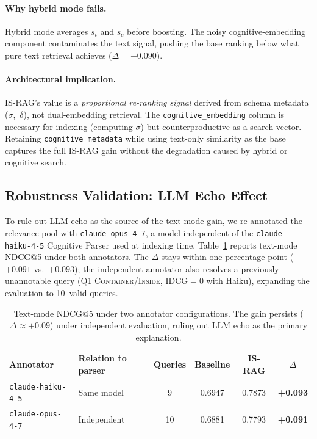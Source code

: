 \documentclass[11pt,a4paper]{article}
\begin{document}
\paragraph{Why hybrid mode fails.}
Hybrid mode averages $s_t$ and $s_c$ before boosting.
The noisy cognitive-embedding component contaminates the text signal,
pushing the base ranking below what pure text retrieval achieves
($\Delta = -0.090$).

\paragraph{Architectural implication.}
IS-RAG's value is a \emph{proportional re-ranking signal} derived from
schema metadata ($\sigma$,~$\delta$), not dual-embedding retrieval.
The \texttt{cognitive\_embedding} column is necessary for indexing
(computing $\sigma$) but counterproductive as a search vector.
Retaining \texttt{cognitive\_metadata} while using text-only similarity
as the base captures the full IS-RAG gain without the degradation
caused by hybrid or cognitive search.

\subsection{Robustness Validation: LLM Echo Effect}
\label{sec:robustness}

To rule out LLM echo as the source of the text-mode gain, we
re-annotated the relevance pool with \texttt{claude-opus-4-7}, a model
independent of the \texttt{claude-haiku-4-5} Cognitive Parser used at
indexing time.
Table~\ref{tab:annotator} reports text-mode NDCG@5 under both
annotators.
The $\Delta$ stays within one percentage point ($+0.091$ vs.\
$+0.093$); the independent annotator also resolves a previously
unannotable query (Q1 \textsc{Container}/\textsc{Inside}, IDCG${=}0$
with Haiku), expanding the evaluation to 10~valid queries.

\begin{table}[H]
\centering
\small
\setlength{\tabcolsep}{5pt}
\begin{tabular}{llcccc}
\toprule
\textbf{Annotator} & \textbf{Relation to parser} & \textbf{Queries} & \textbf{Baseline} & \textbf{IS-RAG} & \textbf{$\Delta$} \\
\midrule
\texttt{claude-haiku-4-5} & Same model & 9  & 0.6947 & 0.7873 & \textbf{+0.093} \\
\texttt{claude-opus-4-7}  & Independent & 10 & 0.6881 & 0.7793 & \textbf{+0.091} \\
\bottomrule
\end{tabular}
\caption{Text-mode NDCG@5 under two annotator configurations.
  The gain persists ($\Delta \approx +0.09$) under independent
  evaluation, ruling out LLM echo as the primary explanation.}
\label{tab:annotator}
\end{table}
\end{document}
